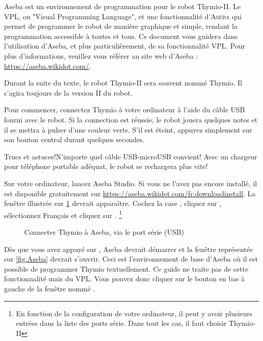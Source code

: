 
Aseba est un environnement de programmation pour le robot Thymio-II. Le VPL, ou "Visual Programming Language", et une fonctionnalité d'\textsc{Aseba} qui permet de programmer le robot de manière graphique et simple, rendant la programmation accessible à toutes et tous. Ce document vous guidera dans l'utilisation d'Aseba, et plus particulièrement, de sa fonctionnalité VPL. Pour plus d'informations, veuillez vous référer au site web d'Aseba : \url{https://aseba.wikidot.com/}.

Durant la suite du texte, le robot Thymio-II sera souvent nommé Thymio. Il s'agira toujours de la version II du robot.


Pour commencer, connectez Thymio à votre ordinateur à l'aide du câble USB fourni avec le robot. Si la connection est réussie, le robot jouera quelques notes et il se mettra à pulser d'une couleur verte. S'il est éteint, appuyez simplement sur son bouton central durant quelques secondes.

\begin{bclogo}[couleur = blue!30, arrondi = 0.1, logo = \bcinfo, ombre = true]{Trucs et astuces!}N'importe quel câble USB-microUSB convient! Avec un chargeur pour téléphone portable adéquat, le robot se rechargera plus vite!
\end{bclogo}

Sur votre ordinateur, lancez Aseba Studio. Si vous ne l'avez pas encore installé, il est disponible gratuitement sur \url{https://aseba.wikidot.com/fr:downloadinstall}. La fenêtre illustrée sur \cref{fig.connect} devrait apparaître. Cochez la case , cliquez sur , sélectionnez Français et cliquez sur . \footnote{En fonction de la configuration de votre ordinateur, il peut y avoir plusieurs entrées dans la liste des ports série. Dans tout les cas, il faut choisir Thymio-II}

\begin{figure}
\begin{center}
\caption{Connecter Thymio à Aseba, via le port série (USB)}\label{fig.connect}
\end{center}
\end{figure} 

Dès que vous avez appuyé sur , Aseba devrait démarrer et la fenêtre représentée sur \cref{fig.Aseba} devrait s'ouvrir. Ceci est l'environnement de base d'Aseba où il est possible de programmer Thymio textuellement. Ce guide ne traite pas de cette fonctionnalité mais du VPL. Vous pouvez donc cliquer sur le bouton en bas à gauche de la fenêtre nommé .

